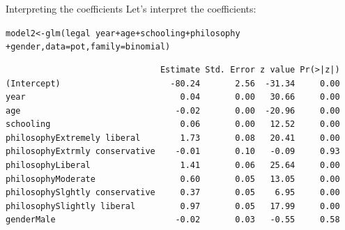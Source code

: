 \documentclass{beamer}\usepackage[]{graphicx}\usepackage[]{color}
\makeatletter
\newcommand{\hlopt}[1]{\textcolor[rgb]{1,0.894,0.769}{#1}}%
\newcommand{\hlstd}[1]{\textcolor[rgb]{1,0.894,0.769}{#1}}%
\newcommand{\hlkwb}[1]{\textcolor[rgb]{0.804,0.776,0.451}{#1}}%
\newcommand{\hlkwc}[1]{\textcolor[rgb]{0.78,0.941,0.545}{#1}}%
\newcommand{\hlkwd}[1]{\textcolor[rgb]{1,0.78,0.769}{#1}}%
\newenvironment{kframe}{%
 \def\at@end@of@kframe{}%
 \ifinner\ifhmode%
  \def\at@end@of@kframe{\end{minipage}}%
  \begin{minipage}{\columnwidth}%
 \fi\fi%
 \def\FrameCommand##1{\hskip\@totalleftmargin \hskip-\fboxsep
 \colorbox{shadecolor}{##1}\hskip-\fboxsep
     \hskip-\linewidth \hskip-\@totalleftmargin \hskip\columnwidth}%
 \MakeFramed {\advance\hsize-\width
   \@totalleftmargin\z@ \linewidth\hsize
   \@setminipage}}%
 {\par\unskip\endMakeFramed%
 \at@end@of@kframe}
\newenvironment{knitrout}{}{} %
\makeatother
\begin{document}
\begin{darkframes}
    \begin{frame}[fragile]{Interpreting the coefficients}
      Let's interpret the coefficients:
      \fontsize{9}{9}\selectfont
\begin{knitrout}
\begin{kframe}
\begin{alltt}
\hlstd{model2} \hlkwb{<-} \hlkwd{glm}\hlstd{(legal} \hlopt{~} \hlstd{year} \hlopt{+} \hlstd{age} \hlopt{+} \hlstd{schooling} \hlopt{+} \hlstd{philosophy}
                      \hlopt{+} \hlstd{gender,} \hlkwc{data}\hlstd{=pot,} \hlkwc{family}\hlstd{=binomial)}
\end{alltt}
\end{kframe}
\end{knitrout}
\begin{knitrout}
\begin{kframe}
\begin{verbatim}
                               Estimate Std. Error z value Pr(>|z|)
(Intercept)                      -80.24       2.56  -31.34     0.00
year                               0.04       0.00   30.66     0.00
age                               -0.02       0.00  -20.96     0.00
schooling                          0.06       0.00   12.52     0.00
philosophyExtremely liberal        1.73       0.08   20.41     0.00
philosophyExtrmly conservative    -0.01       0.10   -0.09     0.93
philosophyLiberal                  1.41       0.06   25.64     0.00
philosophyModerate                 0.60       0.05   13.05     0.00
philosophySlghtly conservative     0.37       0.05    6.95     0.00
philosophySlightly liberal         0.97       0.05   17.99     0.00
genderMale                        -0.02       0.03   -0.55     0.58
\end{verbatim}
\end{kframe}
\end{knitrout}
    \end{frame}


\end{darkframes}
\end{document}
